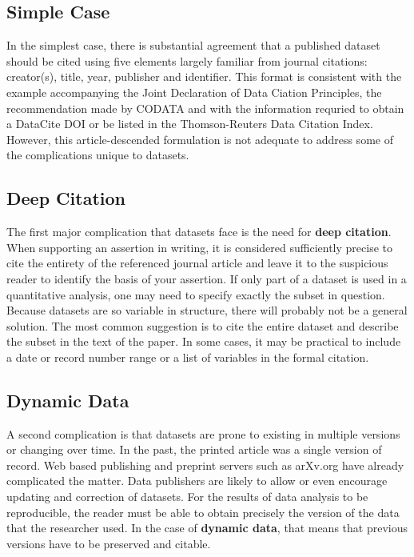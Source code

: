 \documentclass[10pt,a4paper,twocolumn]{article}
\begin{document}
\subsection*{Simple Case}\label{simple-case}

In the simplest case, there is substantial agreement that a published dataset should be cited using five elements largely familiar from journal citations: creator(s), title, year, publisher and identifier. 
This format is consistent with the example accompanying the Joint Declaration of Data Ciation Principles, the recommendation made by CODATA\cite{socha_out_2013} and with the information requried to obtain a DataCite DOI\cite{datacite_datacite_2013} or be listed in the  Thomson-Reuters Data Citation Index.
However, this article-descended formulation is not adequate to address some of the complications unique to datasets.

\subsection*{Deep Citation}\label{deep-citation}

The first major complication that datasets face is the need for \textbf{deep citation}. 
When supporting an assertion in writing, it is considered sufficiently precise to cite the entirety of the referenced journal article and leave it to the suspicious reader to identify the basis of your assertion. 
If only part of a dataset is used in a quantitative analysis, one may need to specify exactly the subset in question. 
Because datasets are so variable in structure, there will probably not be a general solution. 
The most common suggestion is to cite the entire dataset and describe the subset in the text of the paper.\cite{altman_a_2007,}
In some cases, it may be practical to include a date or record number range or a list of variables in the formal citation.

\subsection*{Dynamic Data}\label{dynamic-data}

A second complication is that datasets are prone to existing in multiple versions or changing over time. 
In the past, the printed article was a single version of record.
Web based publishing and preprint servers such as arXv.org have already complicated the matter. 
Data publishers are likely to allow or even encourage updating and correction of datasets. 
For the results of data analysis to be reproducible, the reader must be able to obtain precisely the version of the data that the researcher used. 
In the case of \textbf{dynamic data}, that means that previous versions have to be preserved and citable.
\end{document}
